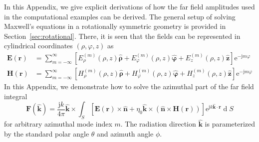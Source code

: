 \documentclass[a4paper,12pt]{article}
\renewcommand{\vec}[1]{\boldsymbol{#1}}
\newcommand{\unitvec}[1]{\hat{\vec{#1}}}
\newcommand{\mrm}[1]{\mathrm{#1}}
\newcommand{\diff}{\operatorname{d}\!}
\newcommand{\ju}{\mrm{j}}
\newcommand{\eu}{\mrm{e}}
\newcommand{\Ev}{\vec{E}}
\newcommand{\Hv}{\vec{H}}
\newcommand{\Fv}{\vec{F}}
\newcommand{\rv}{\vec{r}}
\newcommand{\zuv}{\unitvec{z}}
\newcommand{\nuv}{\unitvec{n}}
\newcommand{\kuv}{\unitvec{k}}
\newcommand{\rhouv}{\unitvec{\rho}}
\newcommand{\varphiuv}{\unitvec{\varphi}}
\begin{document}
In this Appendix, we give explicit derivations of how the far field
amplitudes used in the computational examples can be derived. The
general setup of solving Maxwell's equations in a rotationally
symmetric geometry is provided in Section~\ref{sec:rotational}. There,
it is seen that the fields can be represented in cylindrical
coordinates $(\rho,\varphi,z)$ as
\begin{align}
  \Ev(\rv) &= \sum_{m=-\infty}^{\infty} \left[E_{\rho}^{(m)}(\rho,z)\rhouv + E_{\varphi}^{(m)}(\rho,z)\varphiuv + E_{z}^{(m)}(\rho,z)\zuv \right] \eu^{-\ju m\varphi} \\
  \Hv(\rv) &= \sum_{m=-\infty}^{\infty} \left[H_{\rho}^{(m)}(\rho,z)\rhouv + H_{\varphi}^{(m)}(\rho,z)\varphiuv + H_{z}^{(m)}(\rho,z)\zuv \right] \eu^{-\ju m\varphi}
\end{align}
In this Appendix, we demonstrate how to solve the azimuthal part of
the far field integral 
\begin{equation}
  \Fv(\kuv) = \frac{\ju k}{4\pi} \kuv\times \int_{S} \left[ \Ev(\rv)\times\nuv + \eta_{0}\kuv\times(\nuv\times\Hv(\rv)) \right] \eu^{\ju k\kuv\cdot\rv} \diff S
\end{equation}
for arbitrary azimuthal mode index $m$. The radiation direction $\kuv$
is parameterized by the standard polar angle $\theta$ and azimuth
angle $\phi$.
\end{document}
